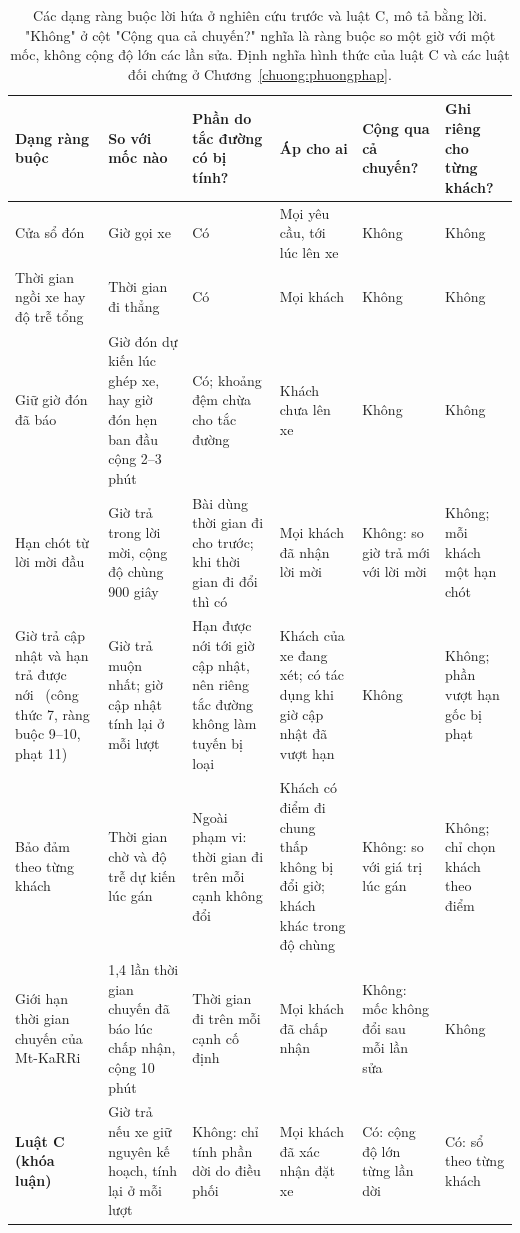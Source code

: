 \begin{table}[htbp]
\centering
\caption{Các dạng ràng buộc lời hứa ở nghiên cứu trước và luật C, mô tả bằng lời. "Không" ở cột "Cộng qua cả
chuyến?" nghĩa là ràng buộc so một giờ với một mốc, không cộng độ lớn các lần sửa. Định nghĩa hình thức của luật C và
các luật đối chứng ở Chương~\ref{chuong:phuongphap}.}
\label{bang:c2-dangrangbuoc}
\footnotesize
\setlength{\tabcolsep}{3pt}
\begin{tabular}{@{}p{2.7cm}p{2.6cm}p{2.5cm}p{2.5cm}p{2.3cm}p{2.3cm}@{}}
\toprule
\textbf{Dạng ràng buộc} & \textbf{So với mốc nào} & \textbf{Phần do tắc đường có bị tính?} & \textbf{Áp cho ai} &
\textbf{Cộng qua cả chuyến?} & \textbf{Ghi riêng cho từng khách?}\\
\midrule
Cửa sổ đón~\cite{alonsomora2017} & Giờ gọi xe & Có & Mọi yêu cầu, tới lúc lên xe & Không & Không\\
Thời gian ngồi xe hay độ trễ tổng~\cite{alonsomora2017,molenbruch2017} & Thời gian đi thẳng & Có & Mọi khách & Không
& Không\\
Giữ giờ đón đã báo~\cite{alonsomora2017,lu2024} & Giờ đón dự kiến lúc ghép xe, hay giờ đón hẹn ban đầu cộng 2--3
phút & Có; khoảng đệm chừa cho tắc đường & Khách chưa lên xe & Không & Không\\
Hạn chót từ lời mời đầu~\cite{schulz2026} & Giờ trả trong lời mời, cộng độ chùng 900 giây & Bài dùng thời gian đi cho
trước; khi thời gian đi đổi thì có & Mọi khách đã nhận lời mời & Không: so giờ trả mới với lời mời & Không; mỗi khách
một hạn chót\\
Giờ trả cập nhật và hạn trả được nới~\cite{horl2022} (công thức 7, ràng buộc 9--10, phạt 11) & Giờ trả muộn nhất;
giờ cập nhật tính lại ở mỗi lượt & Hạn được nới tới giờ cập nhật, nên riêng tắc đường không làm tuyến bị loại & Khách
của xe đang xét; có tác dụng khi giờ cập nhật đã vượt hạn & Không & Không; phần vượt hạn gốc bị phạt\\
Bảo đảm theo từng khách~\cite{elmi2026} & Thời gian chờ và độ trễ dự kiến lúc gán & Ngoài phạm vi: thời gian đi trên
mỗi cạnh không đổi & Khách có điểm đi chung thấp không bị đổi giờ; khách khác trong độ chùng & Không: so với giá trị
lúc gán & Không; chỉ chọn khách theo điểm\\
Giới hạn thời gian chuyến của Mt-KaRRi~\cite{laupichler2026} & 1,4 lần thời gian chuyến đã báo lúc chấp nhận, cộng
10 phút & Thời gian đi trên mỗi cạnh cố định & Mọi khách đã chấp nhận & Không: mốc không đổi sau mỗi lần sửa & Không\\
\textbf{Luật C (khóa luận)} & Giờ trả nếu xe giữ nguyên kế hoạch, tính lại ở mỗi lượt & Không: chỉ tính phần dời do
điều phối & Mọi khách đã xác nhận đặt xe & Có: cộng độ lớn từng lần dời & Có: sổ theo từng khách\\
\bottomrule
\end{tabular}
\end{table}

